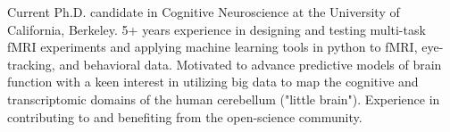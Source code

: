 

\begin{cvparagraph}

Current Ph.D. candidate in Cognitive Neuroscience at the University of California, Berkeley. 5+ years experience in designing and testing multi-task fMRI experiments and applying machine learning tools in python to fMRI, eye-tracking, and behavioral data. Motivated to advance predictive models of brain function with a keen interest in 
utilizing big data to map the cognitive and transcriptomic domains of the human cerebellum ("little brain"). Experience in contributing to and benefiting from the open-science community. 

\end{cvparagraph}
